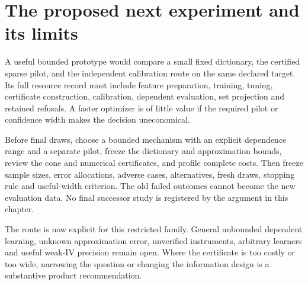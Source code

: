 \section{The proposed next experiment and its limits}

A useful bounded prototype would compare a small fixed dictionary, the
certified sparse pilot, and the independent calibration route on the same
declared target. Its full resource record must include feature preparation,
training, tuning, certificate construction, calibration, dependent evaluation,
set projection and retained refusals. A faster optimizer is of little value if
the required pilot or confidence width makes the decision uneconomical.

Before final draws, choose a bounded mechanism with an explicit dependence
range and a separate pilot, freeze the dictionary and approximation bounds,
review the cone and numerical certificates, and profile complete costs. Then
freeze sample sizes, error allocations, adverse cases, alternatives, fresh
draws, stopping rule and useful-width criterion. The old failed outcomes cannot
become the new evaluation data. No final successor study is registered by the
argument in this chapter.

The route is now explicit for this restricted family. General unbounded
dependent learning, unknown approximation error, unverified instruments,
arbitrary learners and useful weak-IV precision remain open. Where the
certificate is too costly or too wide, narrowing the question or changing the
information design is a substantive product recommendation.
\label{exec13:dependent-pilot-end}
